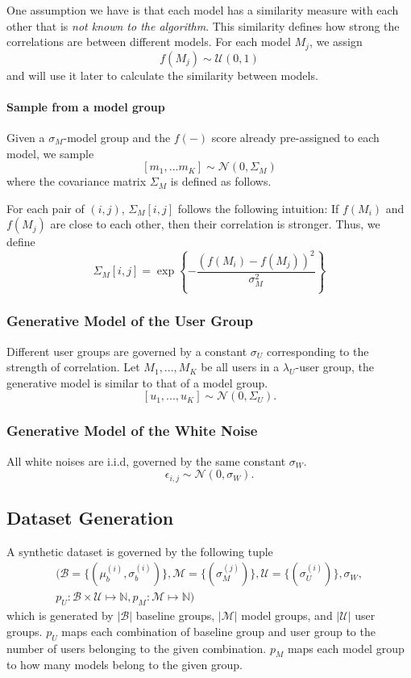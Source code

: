One assumption we have is that each model has a similarity measure with each
other that is {\em not known to the algorithm}. This similarity defines how strong
the correlations are between different models. For each 
model $M_j$, we assign 
\[
f(M_j) \sim \mathcal{\mathcal{U}}(0, 1)
\]
and will use it later to calculate the similarity between models.

\paragraph*{Sample from a model group}

Given a $\sigma_M$-model group and the $f(-)$ score already pre-assigned to each
model, we sample 
\[
[m_1,...m_K] \sim \mathcal{N}(0, \Sigma_M)
\]
where the covariance matrix $\Sigma_M$ is defined as follows.

For each pair of $(i,j)$, $\Sigma_M[i,j]$ follows the following intuition:
If $f(M_i)$ and $f(M_j)$ are close to each other, then their correlation
is stronger. Thus, we define
\[
\Sigma_M[i,j] = \exp \left\{-\frac{(f(M_i) - f(M_j))^2}{\sigma_M^2} \right\}
\]

\subsubsection{Generative Model of the User Group}

Different user groups are governed by a constant $\sigma_U$ corresponding to
the strength of correlation. Let ${M_1,...,M_K}$ be all users in a
$\lambda_U$-user group, the generative model is similar to that of a model group.
\[
[u_1,...,u_K] \sim \mathcal{N}(0, \Sigma_U).
\]

\subsubsection{Generative Model of the White Noise}

All white noises are i.i.d, governed by the same constant $\sigma_W$.
\[
\epsilon_{i,j} \sim \mathcal{N}(0, \sigma_W).
\]


\subsection{Dataset Generation}

A synthetic dataset is governed by the following tuple
\begin{eqnarray*}
( 
\mathcal{B} = \{(\mu_b^{(i)}, \sigma_b^{(i)})\},
\mathcal{M} = \{(\sigma_M^{(j)})\},
\mathcal{U} = \{(\sigma_U^{(i)})\},
\sigma_W,  \\
p_U: \mathcal{B} \times \mathcal{U} \mapsto \mathbb{N},
p_M: \mathcal{M} \mapsto \mathbb{N}
)
\end{eqnarray*}
which is generated by 
$|\mathcal{B}|$ baseline groups, 
$|\mathcal{M}|$ model groups, 
and $|\mathcal{U}|$ user groups. $p_U$
maps each combination of baseline group
and user group to the number of users
belonging to the given combination.
$p_M$ maps each model group to how many
models belong to the given group.

